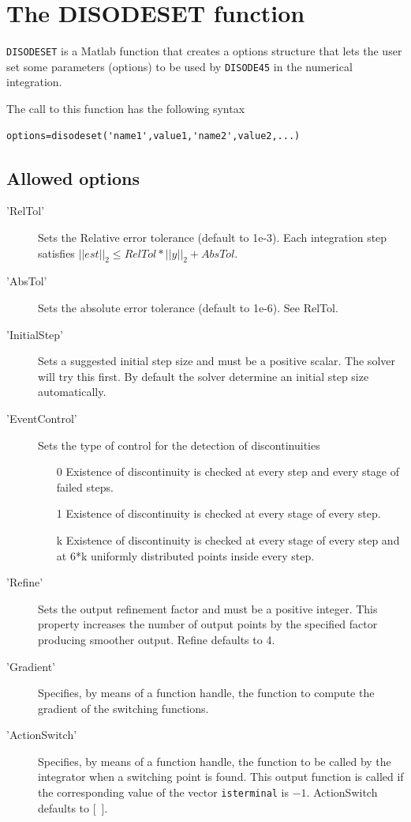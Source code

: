 \documentclass{article}
\begin{document}
\section{The DISODESET function}
\label{disodeset}
\texttt{DISODESET}  is a Matlab function that creates a options structure
that lets the user
set some parameters (options) to be used by \texttt{DISODE45}
in the numerical integration.

The call to this function has the following syntax

\begin{verbatim}
options=disodeset('name1',value1,'name2',value2,...)
\end{verbatim}

\medskip

\subsection{Allowed options}
\begin{description}
\item['RelTol']
Sets the Relative error tolerance  (default to  1e-3).
Each integration step satisfies $||est||_2 \le RelTol*||y||_2+AbsTol$.
\item['AbsTol']
Sets the absolute error tolerance  (default to  1e-6).
 See RelTol.
\item['InitialStep']
Sets a suggested initial step size and must be a positive scalar.
      The solver will try this first.  By default the solver determine an
      initial step size automatically.
\item['EventControl']
Sets the type of control for the detection of discontinuities
\begin{itemize}
\item[0]   Existence of discontinuity is checked at every step and every
          stage of failed steps.
\item[1]   Existence of discontinuity is checked at every stage of every
          step.
\item[k]   Existence of discontinuity is checked at every stage of every
          step and at 6*k uniformly distributed points inside every step.
\end{itemize}
\item['Refine']
Sets the output refinement factor and must be a positive integer.
This property increases the number of output points by the specified
      factor producing smoother output. Refine defaults to 4.
\item['Gradient']
Specifies, by means of a function handle, the function to compute the
gradient of the switching functions.
\item['ActionSwitch']
Specifies, by means of a function handle, the function to be called
by the integrator when a switching point is found.
This output function is called if the corresponding value of the vector \texttt{isterminal} is $-1$. ActionSwitch defaults to [\ ].
\end{description}
\end{document}
